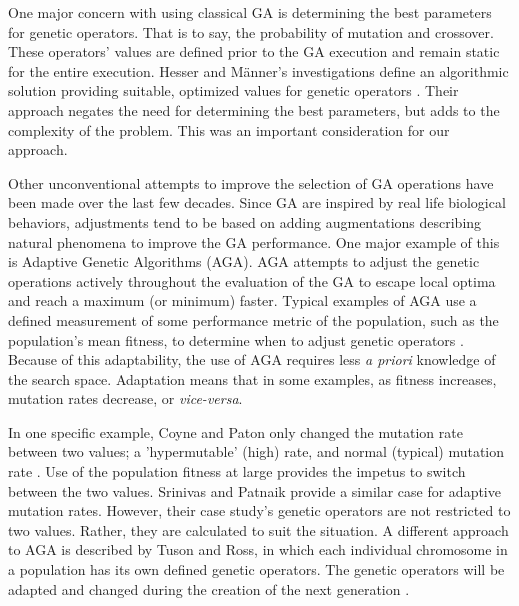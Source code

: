 \documentclass{sig-alternate}
\begin{document}
One major concern with using classical GA is determining the best parameters for genetic operators. That is to say, the probability of mutation and crossover. These operators' values are defined prior to the GA execution and remain static for the entire execution. Hesser and M\"{a}nner's investigations define an algorithmic solution providing suitable, optimized values for genetic operators \cite{hesser1991towards}. Their approach negates the need for determining the best parameters, but adds to the complexity of the problem. This was an important consideration for our approach.

Other unconventional attempts to improve the selection of GA operations have been made over the last few decades. Since GA are inspired by real life biological behaviors, adjustments tend to be based on adding augmentations describing natural phenomena to improve the GA performance. One major example of this is Adaptive Genetic Algorithms (AGA). AGA attempts to adjust the genetic operations actively throughout the evaluation of the GA to escape local optima and reach a maximum (or minimum) faster. Typical examples of AGA use a defined measurement of some performance metric of the population, such as the population's mean fitness, to determine when to adjust genetic operators \cite{coyne1994genetic,srinivas1994adaptive}. Because of this adaptability, the use of AGA requires less \emph{a priori} knowledge of the search space. Adaptation means that in some examples, as fitness increases, mutation rates decrease, or \textit{vice-versa}. 

In one specific example, Coyne and Paton only changed the mutation rate between two values; a 'hypermutable' (high) rate, and normal (typical) mutation rate \cite{coyne1994genetic}. Use of the population fitness at large provides the impetus to switch between the two values. Srinivas and Patnaik provide a similar case for adaptive mutation rates. However, their case study's genetic operators are not restricted to two values. Rather, they are calculated to suit the situation. A different approach to AGA is described by Tuson and Ross, in which each individual chromosome in a population has its own defined genetic operators. The genetic operators will be adapted and changed during the creation of the next generation \cite{tuson1998adapting}. 
\end{document}
